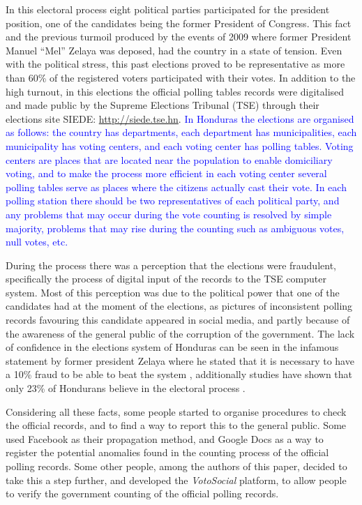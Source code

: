 \documentclass[letterpaper,10pt]{article}
\begin{document}
In this electoral process eight political parties participated for the president position, one of the candidates being the former President of Congress. This fact and the previous turmoil produced by the events of 2009 where former President Manuel “Mel” Zelaya was deposed, had the country in a state of tension. Even with the political stress, this past elections proved to be representative as more than 60\% of the registered voters participated with their votes. In addition to the high turnout, in this elections the official polling tables records were digitalised and made public by the Supreme Elections Tribunal (TSE) through their elections site SIEDE: \url{http://siede.tse.hn}. \textcolor{blue}{In Honduras the elections are organised as follows: the country has departments, each department has municipalities, each municipality has voting centers, and each voting center has polling tables. Voting centers are places that are located near the population to enable domiciliary voting, and to make the process more efficient in each voting center several polling tables serve as places where the citizens actually cast their vote. In each polling station there should be two representatives of each political party, and any problems that may occur during the vote counting is resolved by simple majority, problems that may rise during the counting such as ambiguous votes, null votes, etc.}

During the process there was a perception that the elections were fraudulent, specifically the process of digital input of the records to the TSE computer system. Most of this perception was due to the political power that one of the candidates had at the moment of the elections, as pictures of inconsistent polling records favouring this candidate appeared in social media, and partly because of the awareness of the general public of the corruption of the government. The lack of confidence in the elections system of Honduras can be seen in the infamous statement by former president Zelaya where he stated that it is necessary to have a 10\% fraud to be able to beat the system \citep{melvid}, additionally studies have shown that only 23\% of Hondurans believe in the electoral process \citep{romero2014}.

Considering all these facts, some people started to organise procedures to check the official records, and to find a way to report this to the general public. Some used Facebook as their propagation method, and Google Docs as a way to register the potential anomalies found in the counting process of the official polling records. Some other people, among the authors of this paper, decided to take this a step further, and developed the \textit{VotoSocial} platform, to allow people to verify the government counting of the official polling records.
\end{document}
